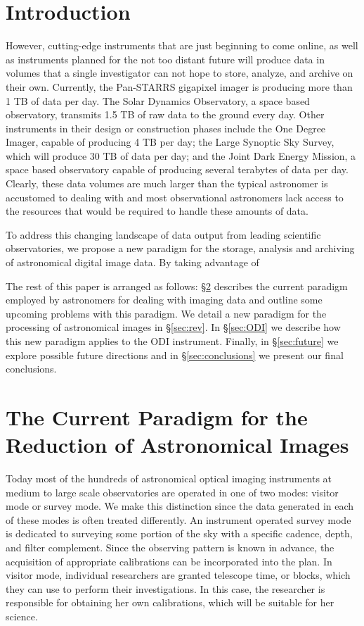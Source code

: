 \documentclass[10pt,conference]{IEEEtran}
\begin{document}
\section{Introduction}\label{sec:intro}

However, cutting-edge instruments that are just beginning to come online, as well as instruments planned for the not too distant future will produce data in volumes that a single investigator can not hope to store, analyze, and archive on their own. Currently, the Pan-STARRS gigapixel imager is producing more than 1 TB of data per day. The Solar Dynamics Observatory, a space based observatory, transmits 1.5 TB of raw data to the ground every day. Other instruments in their design or construction phases include the One Degree Imager, capable of producing 4 TB per day; the Large Synoptic Sky Survey, which will produce 30 TB of data per day; and the Joint Dark Energy Mission, a space based observatory capable of producing several terabytes of data per day. Clearly, these data volumes are much larger than the typical astronomer is accustomed to dealing with and most observational astronomers lack access to the resources that would be required to handle these amounts of data.

To address this changing landscape of data output from leading scientific observatories, we propose a new paradigm for the storage, analysis and archiving of astronomical digital image data. By taking advantage of

The rest of this paper is arranged as follows: \S\ref{sec:current} describes the current paradigm employed by astronomers for dealing with imaging data and outline some upcoming problems with this paradigm. We detail a new paradigm for the processing of astronomical images in \S\ref{sec:rev}. In \S\ref{sec:ODI} we describe how this new paradigm applies to the ODI instrument. Finally, in \S\ref{sec:future} we explore possible future directions and in \S\ref{sec:conclusions} we present our final conclusions.

\section{The Current Paradigm for the Reduction of Astronomical Images}\label{sec:current}

Today most of the hundreds of astronomical optical imaging instruments at medium to large scale observatories are operated in one of two modes: visitor mode or survey mode. We make this distinction since the data generated in each of these modes is often treated differently. An instrument operated survey mode is dedicated to surveying some portion of the sky with a specific cadence, depth, and filter complement. Since the observing pattern is known in advance, the acquisition of appropriate calibrations can be incorporated into the plan. In visitor mode, individual researchers are granted telescope time, or blocks, which they can use to perform their investigations. In this case, the researcher is responsible for obtaining her own calibrations, which will be suitable for her science. 
\end{document}
